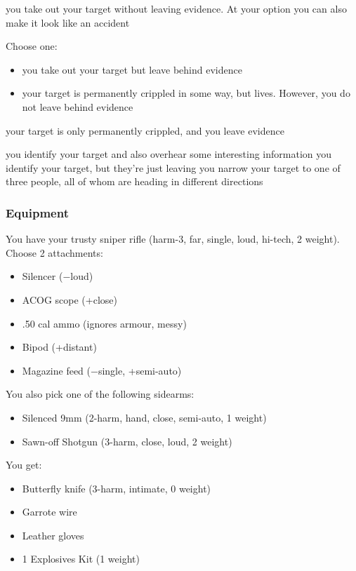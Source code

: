 {you take out your target without leaving evidence. At your option you can also make it look like an accident}
{Choose one:
\begin{itemize}
\item you take out your target but leave behind evidence
\item your target is permanently crippled in some way, but lives. However, you do not leave behind evidence
\end{itemize}}
{your target is only permanently crippled, and you leave evidence}

{you identify your target and also overhear some interesting information}
{you identify your target, but they're just leaving}
{you narrow your target to one of three people, all of whom are heading in different directions}


\subsubsection{Equipment}

You have your trusty sniper rifle (harm-3, far, single, loud, hi-tech, 2 weight). Choose 2 attachments:
\begin{itemize}
\item Silencer ($-$loud)
\item ACOG scope (+close)
\item .50 cal ammo (ignores armour, messy)
\item Bipod (+distant)
\item Magazine feed ($-$single, +semi-auto)
\end{itemize}

You also pick one of the following sidearms:
\begin{itemize}
\item Silenced 9mm (2-harm, hand, close, semi-auto, 1 weight)
\item Sawn-off Shotgun (3-harm, close, loud, 2 weight)
\end{itemize}

You get:
\begin{itemize}
\item Butterfly knife (3-harm, intimate, 0 weight)
\item Garrote wire
\item Leather gloves
\item 1 Explosives Kit (1 weight)
\end{itemize}



